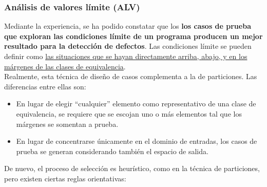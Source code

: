 \subsubsection{Análisis de valores límite (ALV)}

Mediante la experiencia, se ha podido constatar que los \textbf{los casos de prueba que exploran las condiciones límite de un programa producen un mejor resultado para la detección de defectos}. Las condiciones límite se pueden definir como \uline{las situaciones que se hayan directamente arriba, abajo, y en los márgenes de las clases de equivalencia}.\\

Realmente, esta técnica de diseño de casos complementa a la de particiones. Las diferencias entre ellas son:

\begin{itemize}
    \item En lugar de elegir ``cualquier'' elemento como representativo de una clase de equivalencia, se requiere que se escojan uno o más elementos tal que los márgenes se somentan a prueba.
    \item En lugar de concentrarse únicamente en el dominio de entradas, los casos de prueba se generan considerando también el espacio de salida.
\end{itemize}

De nuevo, el proceso de selección es heurístico, como en la técnica de particiones, pero existen ciertas reglas orientativas:


